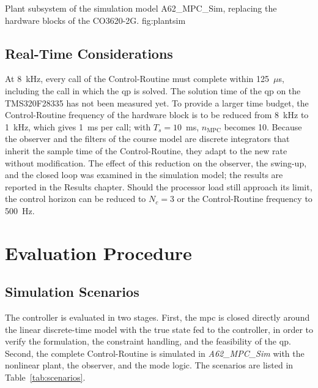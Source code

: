   {Plant subsystem of the simulation model A62\_MPC\_Sim, replacing the hardware blocks of the CO3620-2G.}
  {fig:plantsim}

\subsection{Real-Time Considerations}
\label{subsec:realtime}

At 8~kHz, every call of the Control-Routine must complete within 125~$\mu$s,
including the call in which the \ac{qp} is solved. The solution time of the
\ac{qp} on the TMS320F28335 has not been measured yet. To provide a larger
time budget, the Control-Routine frequency of the hardware block is to be
reduced from 8~kHz to 1~kHz, which gives 1~ms per call; with $T_s = 10$~ms,
$n_{\mathrm{MPC}}$ becomes 10. Because the observer and the filters of the
course model are discrete integrators that inherit the sample time of the
Control-Routine, they adapt to the new rate without modification. The effect
of this reduction on the observer, the swing-up, and the closed loop was
examined in the simulation model; the results are reported in the Results
chapter. Should the
processor load still approach its limit, the control horizon can be reduced to
$N_c = 3$ or the Control-Routine frequency to 500~Hz.

\section{Evaluation Procedure}
\label{sec:evaluation}

\subsection{Simulation Scenarios}
\label{subsec:scenarios}

The controller is evaluated in two stages. First, the \ac{mpc} is closed
directly around the linear discrete-time model with the true state fed to the
controller, in order to verify the formulation, the constraint handling, and
the feasibility of the \ac{qp}. Second, the complete Control-Routine is
simulated in \emph{A62\_MPC\_Sim} with the nonlinear plant, the observer, and
the mode logic. The scenarios are listed in Table~\ref{tab:scenarios}.

